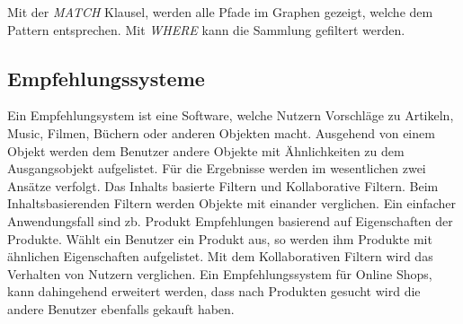 % 

Mit der \textit{MATCH} Klausel, werden alle Pfade im Graphen gezeigt, welche dem Pattern entsprechen. Mit \textit{WHERE} kann die Sammlung gefiltert werden.

\subsection{Empfehlungssysteme}

Ein Empfehlungsystem ist eine Software, welche Nutzern Vorschläge zu Artikeln, Music, Filmen, Büchern oder anderen Objekten macht. \cite{Ricci2010} Ausgehend von einem Objekt werden dem Benutzer andere Objekte mit Ähnlichkeiten zu dem Ausgangsobjekt aufgelistet. Für die Ergebnisse werden im wesentlichen zwei Ansätze verfolgt. Das Inhalts basierte Filtern und Kollaborative Filtern. 
Beim Inhaltsbasierenden Filtern werden Objekte mit einander verglichen. Ein einfacher Anwendungsfall sind zb. Produkt Empfehlungen basierend auf Eigenschaften der Produkte. Wählt ein Benutzer ein Produkt aus, so werden ihm Produkte mit ähnlichen Eigenschaften aufgelistet. 
Mit dem Kollaborativen Filtern wird das Verhalten von Nutzern verglichen. Ein Empfehlungssystem für Online Shops, kann dahingehend erweitert werden, dass nach Produkten gesucht wird die andere Benutzer ebenfalls gekauft haben. 

	